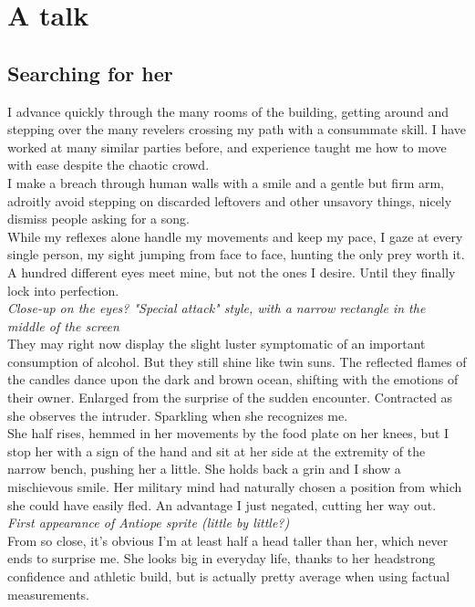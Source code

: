 \documentclass{report}
\newcommand{\dcomment}[1]{
	\emph{#1}
	\\
}
\newcommand{\gsection}[1]{
	\section*{#1}
	\label{#1}
}
\begin{document}
\chapter{A talk}

\gsection{Searching for her}

I advance quickly through the many rooms of the building, getting around and stepping over the many revelers crossing my path with a consummate skill. I have worked at many similar parties before, and experience taught me how to move with ease despite the chaotic crowd.\\

I make a breach through human walls with a smile and a gentle but firm arm, adroitly avoid stepping on discarded leftovers and other unsavory things, nicely dismiss people asking for a song.\\

While my reflexes alone handle my movements and keep my pace, I gaze at every single person, my sight jumping from face to face, hunting the only prey worth it. A hundred different eyes meet mine, but not the ones I desire. Until they finally lock into perfection.\\

\dcomment{
	Close-up on the eyes? "Special attack" style, with a narrow rectangle in the middle of the screen
}

They may right now display the slight luster symptomatic of an important consumption of alcohol. But they still shine like twin suns. The reflected flames of the candles dance upon the dark and brown ocean, shifting with the emotions of their owner. Enlarged from the surprise of the sudden encounter. Contracted as she observes the intruder. Sparkling when she recognizes me.\\

She half rises, hemmed in her movements by the food plate on her knees, but I stop her with a sign of the hand and sit at her side at the extremity of the narrow bench, pushing her a little. She holds back a grin and I show a mischievous smile. Her military mind had naturally chosen a position from which she could have easily fled. An advantage I just negated, cutting her way out.\\

\dcomment{
	First appearance of Antiope sprite (little by little?)
}

From so close, it's obvious I'm at least half a head taller than her, which never ends to surprise me. She looks big in everyday life, thanks to her headstrong confidence and athletic build, but is actually pretty average when using factual measurements.
\end{document}
